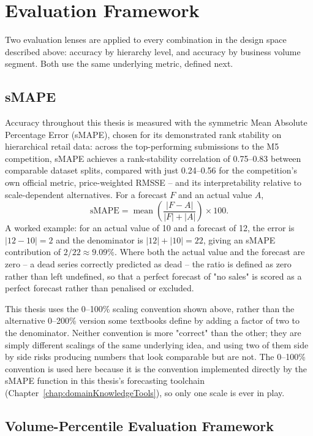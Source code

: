 \section{Evaluation Framework}
\label{sec:evaluationFramework}

Two evaluation lenses are applied to every combination in the design space described above: accuracy by hierarchy level, and accuracy by business volume segment. Both use the same underlying metric, defined next.

\subsection{sMAPE}
\label{sec:smape}

Accuracy throughout this thesis is measured with the symmetric Mean Absolute Percentage Error (sMAPE), chosen for its demonstrated rank stability on hierarchical retail data: across the top-performing submissions to the M5 competition, sMAPE achieves a rank-stability correlation of 0.75--0.83 between comparable dataset splits, compared with just 0.24--0.56 for the competition's own official metric, price-weighted RMSSE \cite{Hewamalage:2021} -- and its interpretability relative to scale-dependent alternatives. For a forecast $F$ and an actual value $A$,
\[
\text{sMAPE} = \operatorname{mean}\!\left( \frac{|F - A|}{|F| + |A|} \right) \times 100 .
\]
A worked example: for an actual value of 10 and a forecast of 12, the error is $|12-10|=2$ and the denominator is $|12|+|10|=22$, giving an sMAPE contribution of $2/22 \approx 9.09\%$. Where both the actual value and the forecast are zero -- a dead series correctly predicted as dead -- the ratio is defined as zero rather than left undefined, so that a perfect forecast of "no sales" is scored as a perfect forecast rather than penalised or excluded.

This thesis uses the 0--100\% scaling convention shown above, rather than the alternative 0--200\% version some textbooks define by adding a factor of two to the denominator. Neither convention is more "correct" than the other; they are simply different scalings of the same underlying idea, and using two of them side by side risks producing numbers that look comparable but are not. The 0--100\% convention is used here because it is the convention implemented directly by the sMAPE function in this thesis's forecasting toolchain (Chapter~\ref{chap:domainKnowledgeTools}), so only one scale is ever in play.

\subsection{Volume-Percentile Evaluation Framework}
\label{sec:volumeFramework}

